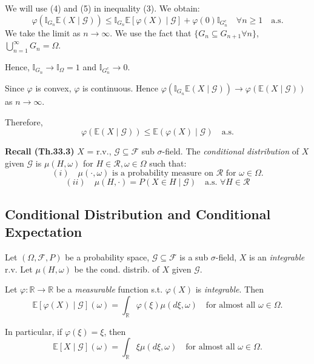 We will use (4) and (5) in inequality (3). We obtain:
\[
\varphi(\mathbb{I}_{G_n} \mathbb{E}(X \mid \mathcal{G})) \leq \mathbb{I}_{G_n} \mathbb{E}[\varphi(X) \mid \mathcal{G}] + \varphi(0) \mathbb{I}_{G_n^c} \quad \forall n \geq 1 \quad \text{a.s.}
\]
We take the limit as $n \to \infty$. We use the fact that $\{G_n \subseteq G_{n+1} \forall n \}$, $\bigcup_{n=1}^{\infty} G_n = \Omega$.

Hence, $\mathbb{I}_{G_n} \to \mathbb{I}_{\Omega} = 1$ and $\mathbb{I}_{G_n^c} \to 0$.

Since $\varphi$ is convex, $\varphi$ is continuous. Hence $\varphi(\mathbb{I}_{G_n} \mathbb{E}(X \mid \mathcal{G})) \to \varphi(\mathbb{E}(X \mid \mathcal{G}))$ as $n \to \infty$.

Therefore,
\[
\varphi(\mathbb{E}(X \mid \mathcal{G})) \leq \mathbb{E}(\varphi(X) \mid \mathcal{G}) \quad \text{a.s.}
\]


\textbf{Recall (Th.33.3)} $X$ = r.v., $\mathcal{G} \subseteq \mathcal{F}$ sub $\sigma$-field. The \emph{conditional distribution} of $X$ given $\mathcal{G}$ is $\mu(H, \omega)$ for $H \in \mathcal{R}, \omega \in \Omega$ such that:
\[
(i) \quad \mu(\cdot, \omega) \text{ is a probability measure on } \mathcal{R} \text{ for } \omega \in \Omega.
\]
\[
(ii) \quad \mu(H, \cdot) = P(X \in H \mid \mathcal{G}) \quad \text{a.s. } \forall H \in \mathcal{R}
\]
\subsection{Conditional Distribution and Conditional Expectation}
\begin{theorem}
Let $(\Omega, \mathcal{F}, P)$ be a probability space, $\mathcal{G} \subseteq \mathcal{F}$ is a sub $\sigma$-field, $X$ is an \emph{integrable} r.v. Let $\mu(H, \omega)$ be the cond. distrib. of $X$ given $\mathcal{G}$.

Let $\varphi: \mathbb{R} \to \mathbb{R}$ be a \emph{measurable} function s.t. $\varphi(X)$ is \emph{integrable}. Then
\[
\mathbb{E}[\varphi(X) \mid \mathcal{G}](\omega) = \int_{\mathbb{R}} \varphi(\xi) \mu(d\xi, \omega) \quad \text{for almost all } \omega \in \Omega.
\]

In particular, if $\varphi(\xi) = \xi$, then
\[
\mathbb{E}[X \mid \mathcal{G}](\omega) = \int_{\mathbb{R}} \xi \mu(d\xi, \omega) \quad \text{for almost all } \omega \in \Omega.
\]

\end{theorem}


